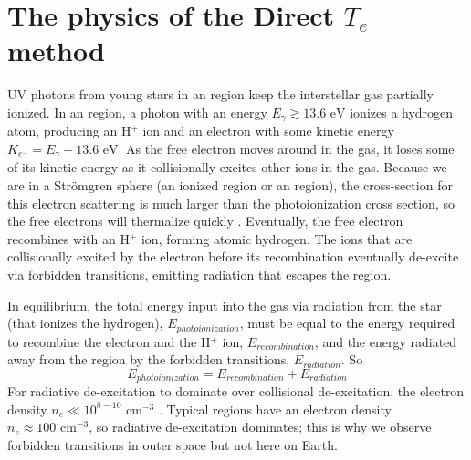 \chapter[Direct method physics]{The physics of the Direct $T_e$ method}\label{sec:physics}

UV photons from young stars in an  region keep the interstellar gas 
partially ionized.  In an  region, a photon with an energy 
$E_\gamma \gtrsim 13.6\text{ eV}$ ionizes a hydrogen atom, producing an H$^+$ 
ion and an electron with some kinetic energy 
$K_{e^-} = E_\gamma - 13.6\text{ eV}$.  As the free electron moves around in the 
gas, it loses some of its kinetic energy as it collisionally excites other ions 
in the gas.  Because we are in a Str\"{o}mgren sphere (an ionized region or an 
 region), the cross-section for this electron scattering is much 
larger than the photoionization cross section, so the free electrons will 
thermalize quickly \citep{DeRobertis87}.  Eventually, the free electron 
recombines with an H$^+$ ion, forming atomic hydrogen.  The ions that are 
collisionally excited by the electron before its recombination eventually 
de-excite via forbidden transitions, emitting radiation that escapes the 
 region.

In equilibrium, the total energy input into the gas via radiation from the star 
(that ionizes the hydrogen), $E_{photoionization}$, must be equal to the energy 
required to recombine the electron and the H$^+$ ion, $E_{recombination}$, and 
the energy radiated away from the  region by the forbidden 
transitions, $E_{radiation}$.  So
\begin{equation}
    E_{photoionization} = E_{recombination} + E_{radiation}
\end{equation}
For radiative de-excitation to dominate over collisional de-excitation, the 
electron density $n_e \ll 10^{8-10}\text{ cm}^{-3}$ \citep{DeRobertis87}.  
Typical  regions have an electron density 
$n_e \approx 100\text{ cm}^{-3}$, so radiative de-excitation dominates; this is 
why we observe forbidden transitions in outer space but not here on Earth.


